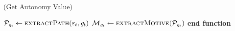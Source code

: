 \documentclass{article}
\begin{document}
\begin{algorithm}
	\caption{(Get Autonomy Value)}
	\label{array-sum}
	\begin{algorithmic}[1]
			\Statex
			\State $\mathcal{P}_{\mathit{g}_{t}} \gets \Call{extractPath}{\varepsilon_t,
			\mathit{g}_{t}}$
			\State $\mathcal{M}_{\mathit{g}_{t}} \gets
			\Call{extractMotive}{\mathcal{P}_{\mathit{g}_{t}}}$
			\Statex
					\State {}
				 \State {}
				\EndIf
			\Else
				\State {}
			\EndIf
		\EndFunction 
	\State \textbf{end function}
	\end{algorithmic}
\end{algorithm}
\end{document}
